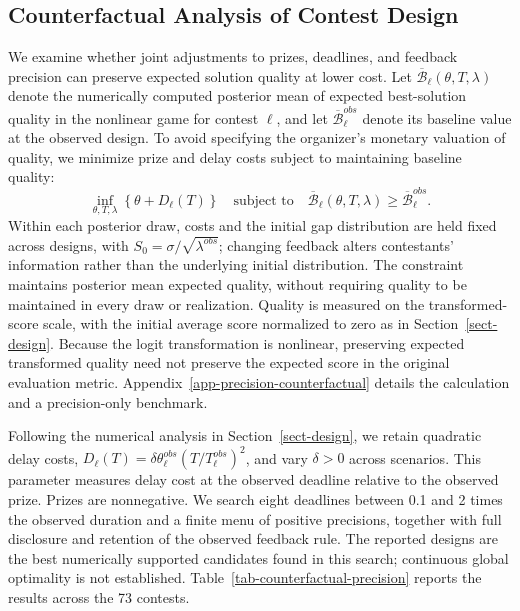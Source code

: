 \documentclass[mnsc]{informs3}
\begin{document}
\subsection{Counterfactual Analysis of Contest Design}\label{sect-precision-design}

We examine whether joint adjustments to prizes, deadlines, and feedback precision can preserve expected solution quality at lower cost. Let $\overline{\mathcal B}_\ell(\theta,T,\lambda)$ denote the numerically computed posterior mean of expected best-solution quality in the nonlinear game for contest $\ell$, and let $\overline{\mathcal B}^{obs}_\ell$ denote its baseline value at the observed design. To avoid specifying the organizer's monetary valuation of quality, we minimize prize and delay costs subject to maintaining baseline quality:
\begin{equation}\label{eq-empirical-joint-design}
\inf_{\theta,T,\lambda}\left\{\theta+D_\ell(T)\right\}
\quad\text{subject to}\quad
\overline{\mathcal B}_\ell(\theta,T,\lambda)\geq \overline{\mathcal B}^{obs}_\ell.
\end{equation}
Within each posterior draw, costs and the initial gap distribution are held fixed across designs, with $S_0=\sigma/\sqrt{\lambda^{obs}}$; changing feedback alters contestants' information rather than the underlying initial distribution. The constraint maintains posterior mean expected quality, without requiring quality to be maintained in every draw or realization. {Quality is measured on the transformed-score scale, with the initial average score normalized to zero as in Section~\ref{sect-design}. Because the logit transformation is nonlinear, preserving expected transformed quality need not preserve the expected score in the original evaluation metric.} Appendix~\ref{app-precision-counterfactual} details the calculation and a precision-only benchmark.

Following the numerical analysis in Section~\ref{sect-design}, we retain quadratic delay costs, $D_\ell(T)=\delta\theta_\ell^{obs}(T/T_\ell^{obs})^2$, and vary $\delta>0$ across scenarios. This parameter measures delay cost at the observed deadline relative to the observed prize. Prizes are nonnegative. We search eight deadlines between 0.1 and 2 times the observed duration and a finite menu of positive precisions, together with full disclosure and retention of the observed feedback rule. The reported designs are the best numerically supported candidates found in this search; continuous global optimality is not established. Table~\ref{tab-counterfactual-precision} reports the results across the 73 contests.
\end{document}
